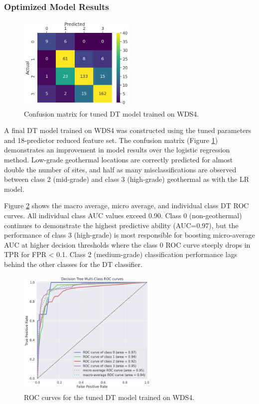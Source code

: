 \subsubsection{Optimized Model Results}

\begin{figure}[!htp]
\centering
\includegraphics[width=0.5\textwidth]{templates/images/Figure-DT-ConfusionMatrix.png}
\singlespacing
\caption[Decision tree confusion matrix]{Confusion matrix for tuned DT model trained on WDS4.}
\label{fig:dtree_conf_matrix}
\end{figure}

A final DT model trained on WDS4 was constructed using the tuned parameters and 18-predictor reduced feature set. The confusion matrix (Figure \ref{fig:dtree_conf_matrix}) demonstrates an improvement in model results over the logistic regression method. Low-grade geothermal locations are correctly predicted for almost double the number of sites, and half as many misclassifications are observed between class 2 (mid-grade) and class 3 (high-grade) geothermal as with the LR model.

Figure \ref{fig:dtree_auc} shows the macro average, micro average, and individual class DT ROC curves. All individual class AUC values exceed 0.90. Class 0 (non-geothermal) continues to demonstrate the highest predictive ability (AUC=0.97), but the performance of class 3 (high-grade) is most responsible for boosting micro-average AUC at higher decision thresholds where the class 0 ROC curve steeply drops in TPR for FPR < 0.1. Class 2 (medium-grade) classification performance lags behind the other classes for the DT classifier.

\begin{figure}[!htp]
\centering
\includegraphics[width=0.6\textwidth]{templates/images/Figure-DT_AUC.png}
\caption[Decision tree ROC curves]{ROC curves for the tuned DT model trained on WDS4.}
\label{fig:dtree_auc}
\end{figure}

